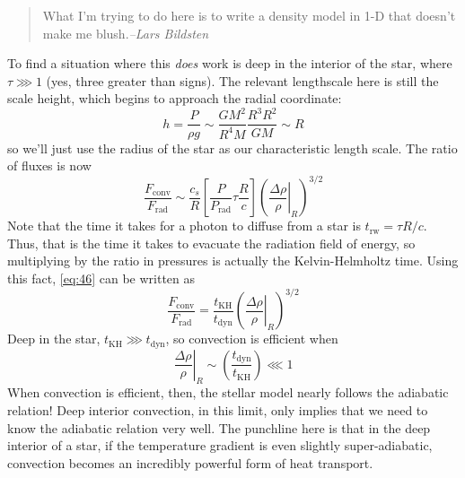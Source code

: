 \documentclass[10pt]{article}
\numberwithin{equation}{section}
\begin{document}
  \begin{quote}
    What I'm trying to do here is to write a density model in 1-D that
    doesn't make me blush.\hfill \emph{--Lars Bildsten}
  \end{quote}
  To find a situation where this \emph{does} work is deep in the
  interior of the star, where $\tau \ggg 1$ (yes, three greater than
  signs). The relevant lengthscale here is still the scale height,
  which begins to approach the radial coordinate:
  \begin{equation}
    \label{eq:45}
    h=\frac{P}{\rho g}\sim\frac{GM^2}{R^4M}\frac{R^3R^2}{GM}\sim R
  \end{equation}
  so we'll just use the radius of the star as our characteristic
  length scale. The ratio of fluxes is now 
  \begin{equation}
    \label{eq:46}
    \frac{F_{\mathrm{conv}}}{F_{\mathrm{rad}}}\sim \frac{c_s}{R}\left[\frac
{P}{P_{\mathrm{rad}}}\tau\frac{R}{c}\right]\left(\left.\frac{\Delta\rho}
{\rho}\right|_{R}\right)^{3/2}
  \end{equation}
  Note that the time it takes for a photon to diffuse from a star is
  $t_{\mathrm{rw}}=\tau R/c$. Thus, that is the time it takes to
  evacuate the radiation field of energy, so multiplying by the ratio
  in pressures is actually the Kelvin-Helmholtz time. Using this fact,
  \eqref{eq:46} can be written as
  \begin{equation}
    \label{eq:47}
    \frac{F_{\mathrm{conv}}}{F_{\mathrm{rad}}}=\frac{t_{\mathrm{KH}}}{t_
{\mathrm{dyn}}}\left(\left.\frac{\Delta\rho}{\rho}\right|_{R}\right)^{3/2}
  \end{equation}
  Deep in the star, $t_{\mathrm{KH}}\ggg t_{\mathrm{dyn}}$, so
  convection is efficient when
  \begin{equation}
    \label{eq:48}
    \left.\frac{\Delta\rho}{\rho}\right|_R\sim\left(\frac{t_{\mathrm{dyn}}}
{t_{\mathrm{KH}}}\right)\lll 1
  \end{equation}
  When convection is efficient, then, the stellar model nearly follows
  the adiabatic relation! Deep interior convection, in this limit,
  only implies that we need to know the adiabatic relation very
  well. The punchline here is that in the deep interior of a star, if
  the temperature gradient is even slightly super-adiabatic,
  convection becomes an incredibly powerful form of heat transport.\\
\end{document}

